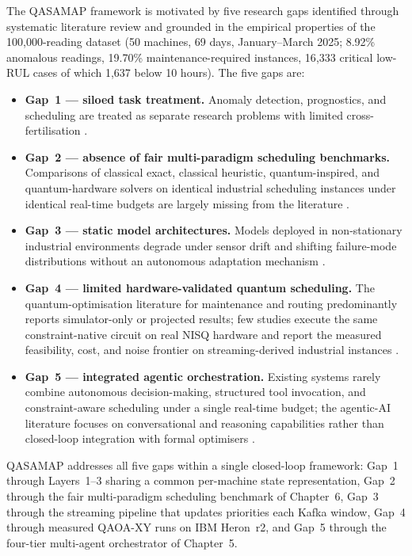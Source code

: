 The QASAMAP framework is motivated by five research gaps identified through systematic literature review and grounded in the empirical properties of the 100{,}000-reading dataset (50 machines, 69 days, January--March 2025; 8.92\% anomalous readings, 19.70\% maintenance-required instances, 16{,}333 critical low-RUL cases of which 1{,}637 below 10 hours). The five gaps are:
\begin{itemize}
    \item \textbf{Gap~1 --- siloed task treatment.} Anomaly detection, prognostics, and scheduling are treated as separate research problems with limited cross-fertilisation \cite{Chalapathy2019,pang_deep_2021,Gao2022}.
    \item \textbf{Gap~2 --- absence of fair multi-paradigm scheduling benchmarks.} Comparisons of classical exact, classical heuristic, quantum-inspired, and quantum-hardware solvers on identical industrial scheduling instances under identical real-time budgets are largely missing from the literature \cite{Blekos2024,symons_practitioners_2023}.
    \item \textbf{Gap~3 --- static model architectures.} Models deployed in non-stationary industrial environments degrade under sensor drift and shifting failure-mode distributions without an autonomous adaptation mechanism \cite{lee_autoencoder-based_2024}.
    \item \textbf{Gap~4 --- limited hardware-validated quantum scheduling.} The quantum-optimisation literature for maintenance and routing predominantly reports simulator-only or projected results; few studies execute the same constraint-native circuit on real NISQ hardware and report the measured feasibility, cost, and noise frontier on streaming-derived industrial instances \cite{kreplin_squlearn_2025,rosendo_quantum_2025}.
    \item \textbf{Gap~5 --- integrated agentic orchestration.} Existing systems rarely combine autonomous decision-making, structured tool invocation, and constraint-aware scheduling under a single real-time budget; the agentic-AI literature focuses on conversational and reasoning capabilities rather than closed-loop integration with formal optimisers \cite{ouyang_llmsense_2024,xing_deepsqa_2021}.
\end{itemize}
QASAMAP addresses all five gaps within a single closed-loop framework: Gap~1 through Layers~1--3 sharing a common per-machine state representation, Gap~2 through the fair multi-paradigm scheduling benchmark of Chapter~6, Gap~3 through the streaming pipeline that updates priorities each Kafka window, Gap~4 through measured QAOA-XY runs on IBM Heron~r2, and Gap~5 through the four-tier multi-agent orchestrator of Chapter~5.

